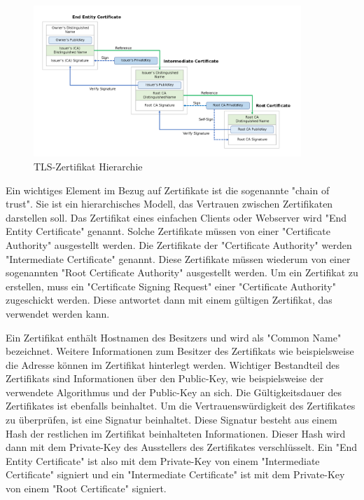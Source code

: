\begin{figure}[H]
    \centering
    \includegraphics[width=0.9\textwidth]{media/OpenSSL/cert.png}
    \caption{TLS-Zertifikat Hierarchie \cite{ChainOfTrust}}
\end{figure}

Ein wichtiges Element im Bezug auf Zertifikate ist die sogenannte "chain of trust". Sie ist ein hierarchisches Modell, das Vertrauen zwischen Zertifikaten darstellen soll. Das Zertifikat eines einfachen Clients oder Webserver wird "End Entity Certificate" genannt. Solche Zertifikate müssen von einer "Certificate Authority" ausgestellt werden. Die Zertifikate der "Certificate Authority" werden "Intermediate Certificate" genannt. Diese Zertifikate müssen wiederum von einer sogenannten "Root Certificate Authority" ausgestellt werden. Um ein Zertifikat zu erstellen, muss ein "Certificate Signing Request" einer "Certificate Authority" zugeschickt werden. Diese antwortet dann mit einem gültigen Zertifikat, das verwendet werden kann.

Ein Zertifikat enthält Hostnamen des Besitzers und wird als "Common Name" bezeichnet. Weitere Informationen zum Besitzer des Zertifikats wie beispielsweise die Adresse können im Zertifikat hinterlegt werden. Wichtiger Bestandteil des Zertifikats sind Informationen über den Public-Key, wie beispielsweise der verwendete Algorithmus und der Public-Key an sich. Die Gültigkeitsdauer des Zertifikates ist ebenfalls beinhaltet. Um die Vertrauenswürdigkeit des Zertifikates zu überprüfen, ist eine Signatur beinhaltet. Diese Signatur besteht aus einem Hash der restlichen im Zertifikat beinhalteten Informationen. Dieser Hash wird dann mit dem Private-Key des Ausstellers des Zertifikates verschlüsselt. Ein "End Entity Certificate" ist also mit dem Private-Key von einem "Intermediate Certificate" signiert und ein "Intermediate Certificate" ist mit dem Private-Key von einem "Root Certificate" signiert. \cite{ChainOfTrust}

